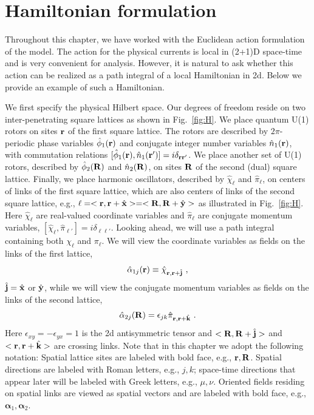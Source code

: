 \section{Hamiltonian formulation}
\label{section::H}
Throughout this chapter, we have worked with the Euclidean action formulation of the model.  The action for the physical currents is local in (2+1)D space-time and is very convenient for analysis.  However, it is natural to ask whether this action can be realized as a path integral of a local Hamiltonian in 2d.\cite{Matthew_Alexei_thanks}  Below we provide an example of such a Hamiltonian.

We first specify the physical Hilbert space.  Our degrees of freedom reside on two inter-penetrating square lattices as shown in Fig.~\ref{fig:H}.  We place quantum U(1) rotors on sites ${\bf r}$ of the first square lattice.  The rotors are described by $2\pi$-periodic phase variables $\hat{\phi}_1({\bf r})$ and conjugate integer number variables $\hat{n}_1({\bf r})$, with commutation relations $[\hat{\phi}_1({\bf r}), \hat{n}_1({\bf r}')] = i \delta_{{\bf r}{\bf r}'}$.  We place another set of U(1) rotors, described by $\hat{\phi}_2({\bf R})$ and $\hat{n}_2({\bf R})$, on sites ${\bf R}$ of the second (dual) square lattice.  Finally, we place harmonic oscillators, described by $\hat{\chi}_\ell$ and $\hat{\pi}_\ell$, on centers of links of the first square lattice, which are also centers of links of the second square lattice, e.g., $\ell = <{\bf r}, {\bf r} + \hat{{\bf x}}> = <{\bf R}, {\bf R} + \hat{{\bf y}}>$ as illustrated in Fig.~\ref{fig:H}.  Here $\hat{\chi}_\ell$ are real-valued coordinate variables and $\hat{\pi}_\ell$ are conjugate momentum variables, $[\hat{\chi}_\ell, \hat{\pi}_{\ell'}] = i\delta_{\ell\ell'}$.  Looking ahead, we will use a path integral containing both $\chi_\ell$ and $\pi_\ell$.  We will view the coordinate variables as fields on the links of the first lattice,
\begin{equation}
\hat{\alpha}_{1j}({\bf r}) \equiv \hat{\chi}_{{\bf r}, {\bf r} + \hat{{\bf j}}} ~,
\end{equation}
$\hat{{\bf j}} = \hat{{\bf x}}$ or $\hat{{\bf y}}$, while we will view the conjugate momentum variables as fields on the links of the second lattice,
\begin{equation}
\hat{\alpha}_{2j}({\bf R}) = \epsilon_{jk} \hat{\pi}_{{\bf r}, {\bf r} + \hat{{\bf k}}} ~.
\end{equation}
Here $\epsilon_{xy} = -\epsilon_{yx} = 1$ is the 2d antisymmetric tensor and $<{\bf R}, {\bf R} + \hat{{\bf j}}>$ and $<{\bf r}, {\bf r} + \hat{{\bf k}}>$ are crossing links.\cite{footnoteKitaev}
Note that in this chapter we adopt the following notation:  Spatial lattice sites are labeled with bold face, e.g., ${\bf r}, {\bf R}$.  Spatial directions are labeled with Roman letters, e.g., $j, k$; space-time directions that appear later will be labeled with Greek letters, e.g., $\mu, \nu$.  Oriented fields residing on spatial links are viewed as spatial vectors and are labeled with bold face, e.g., ${\bm \alpha_1}, {\bm \alpha_2}$.

